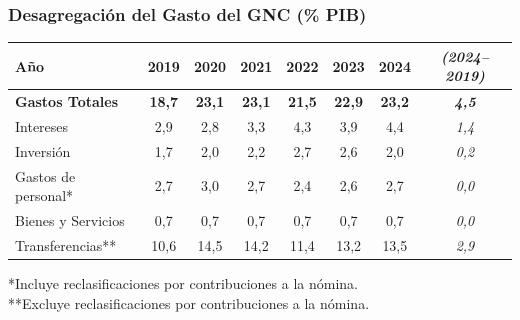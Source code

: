 \begin{frame}
\frametitle{Desagregación del Gasto del GNC (\% PIB)}

\begin{table}
\centering
\begin{tabular}{lccccccc}
\hline
\textbf{Año}                      & \textbf{2019} & \textbf{2020} & \textbf{2021} & \textbf{2022} & \textbf{2023} & \textbf{2024} & \textit{\textbf{(2024–2019)}} \\ \hline
\textbf{Gastos Totales}           & \textbf{18,7} & \textbf{23,1} & \textbf{23,1} & \textbf{21,5} & \textbf{22,9} & \textbf{23,2} & \textbf{\textit{4,5}} \\
Intereses                         & 2,9           & 2,8           & 3,3           & 4,3           & 3,9           & 4,4           & \textit{1,4} \\
Inversión                         & 1,7           & 2,0           & 2,2           & 2,7           & 2,6           & 2,0           & \textit{0,2} \\
Gastos de personal*               & 2,7           & 3,0           & 2,7           & 2,4           & 2,6           & 2,7           & \textit{0,0} \\
Bienes y Servicios           & 0,7           & 0,7           & 0,7           & 0,7           & 0,7           & 0,7           & \textit{0,0} \\
Transferencias**                  & 10,6          & 14,5          & 14,2          & 11,4          & 13,2          & 13,5          & \textit{2,9} \\ \hline
\end{tabular}

\vspace{0.2cm}
\footnotesize{*Incluye reclasificaciones por contribuciones a la nómina.}\\
\footnotesize{**Excluye reclasificaciones por contribuciones a la nómina.}\\

\end{table}

\end{frame}
